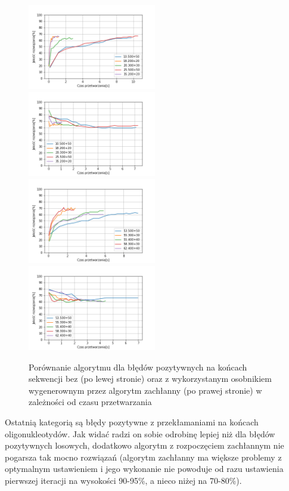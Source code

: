 \documentclass{article}
\begin{document}
\begin{figure}[H]
\includegraphics[width=0.5\textwidth]{Czaspoz-oli1.png}
\includegraphics[width=0.5\textwidth]{Czaspoz-oli-greedy1.png}
\includegraphics[width=0.5\textwidth]{Czaspoz-oli2.png}
\includegraphics[width=0.5\textwidth]{Czaspoz-oli-greedy2.png}
\caption{Porównanie algorytmu dla błędów pozytywnych na końcach sekwencji bez (po lewej stronie) oraz z wykorzystanym osobnikiem wygenerownym przez algorytm zachłanny (po prawej stronie) w zależności od czasu przetwarzania}
\end{figure}
Ostatnią kategorią są błędy pozytywne z przekłamaniami na końcach oligonukleotydów. Jak widać radzi on sobie odrobinę lepiej niż dla błędów pozytywnych losowych, dodatkowo algorytm z rozpoczęciem zachłannym nie pogarsza tak mocno rozwiązań (algorytm zachłanny ma większe problemy z optymalnym ustawieniem i jego wykonanie nie powoduje od razu ustawienia pierwszej iteracji na wysokości 90-95\%, a nieco niżej na 70-80\%).
\end{document}

